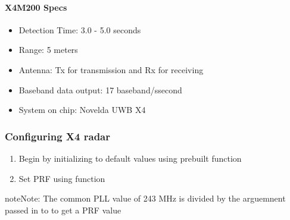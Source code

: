 \documentclass[letterpaper,10pt,english]{sphinxmanual}
\begin{document}
\paragraph{X4M200 Specs}
\label{\detokenize{radar information:x4m200-specs}}\begin{itemize}
\item {} 
Detection Time: 3.0  - 5.0 seconds

\item {} 
Range: 5 meters

\item {} 
Antenna: Tx for transmission and Rx for receiving

\item {} 
Baseband data output: 17 baseband/ssecond

\item {} 
System on chip: Novelda UWB X4

\end{itemize}


\subsubsection{Configuring X4 radar}
\label{\detokenize{radar information:configuring-x4-radar}}\begin{enumerate}
\def\theenumi{\arabic{enumi}}
\def\labelenumi{\theenumi .}
\makeatletter\def\p@enumii{\p@enumi \theenumi .}\makeatother
\item {} 
Begin by initializing to default values using prebuilt function 

\item {} 
Set PRF using function 

\end{enumerate}

\begin{sphinxadmonition}{note}{Note:}
The common PLL value of 243 MHz is divided by the arguemnent passed in to  to get a PRF value
\end{sphinxadmonition}
\end{document}

